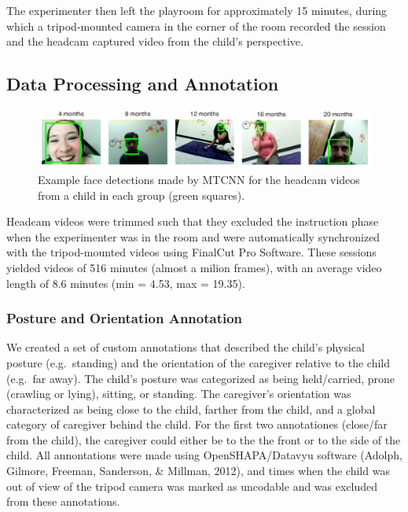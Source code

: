 \documentclass[10pt, letterpaper]{article}
\begin{document}
The experimenter then left the playroom for approximately 15 minutes,
during which a tripod-mounted camera in the corner of the room recorded
the session and the headcam captured video from the child's perspective.

\subsection{Data Processing and
Annotation}\label{data-processing-and-annotation}

\begin{figure}
\includegraphics[width=6in]{images/framesample.pdf}
\caption{\label{fig:frames} Example face detections made by MTCNN for the headcam videos from a child in each group  (green squares).}
\end{figure}

Headcam videos were trimmed such that they excluded the instruction
phase when the experimenter was in the room and were automatically
synchronized with the tripod-mounted videos using FinalCut Pro Software.
These sessions yielded videos of 516 minutes (almost a milion frames),
with an average video length of 8.6 minutes (min = 4.53, max = 19.35).

\subsubsection{Posture and Orientation
Annotation}\label{posture-and-orientation-annotation}

We created a set of custom annotations that described the child's
physical posture (e.g.~standing) and the orientation of the caregiver
relative to the child (e.g.~far away). The child's posture was
categorized as being held/carried, prone (crawling or lying), sitting,
or standing. The caregiver's orientation was characterized as being
close to the child, farther from the child, and a global category of
caregiver behind the child. For the first two annotationes (close/far
from the child), the caregiver could either be to the the front or to
the side of the child. All annontations were made using
OpenSHAPA/Datavyu software (Adolph, Gilmore, Freeman, Sanderson, \&
Millman, 2012), and times when the child was out of view of the tripod
camera was marked as uncodable and was excluded from these annotations.
\end{document}

